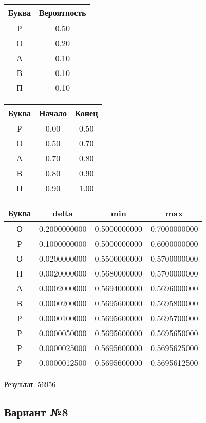 \documentclass[a4paper, 12pt]{article}
\begin{document}
\begin{center}
 \begin{tabular}{ |c|c| } 
  \hline
     Буква & Вероятность \\ \hline
Р & 0.50\\\hline
О & 0.20\\\hline
А & 0.10\\\hline
В & 0.10\\\hline
П & 0.10
\\ \hline \end{tabular}
\end{center}
\begin{center}
 \begin{tabular}{ |c|c|c| } 
  \hline
     Буква & Начало & Конец \\ \hline
Р & 0.00 & 0.50\\\hline
О & 0.50 & 0.70\\\hline
А & 0.70 & 0.80\\\hline
В & 0.80 & 0.90\\\hline
П & 0.90 & 1.00
\\ \hline \end{tabular}
\end{center}
\begin{center}
 \begin{tabular}{ |c|c|c|c| } 
  \hline
     Буква & delta & min & max \\ \hline
О & 0.2000000000 & 0.5000000000 & 0.7000000000\\\hline
Р & 0.1000000000 & 0.5000000000 & 0.6000000000\\\hline
О & 0.0200000000 & 0.5500000000 & 0.5700000000\\\hline
П & 0.0020000000 & 0.5680000000 & 0.5700000000\\\hline
А & 0.0002000000 & 0.5694000000 & 0.5696000000\\\hline
В & 0.0000200000 & 0.5695600000 & 0.5695800000\\\hline
Р & 0.0000100000 & 0.5695600000 & 0.5695700000\\\hline
Р & 0.0000050000 & 0.5695600000 & 0.5695650000\\\hline
Р & 0.0000025000 & 0.5695600000 & 0.5695625000\\\hline
Р & 0.0000012500 & 0.5695600000 & 0.5695612500
\\ \hline \end{tabular}
\end{center}
Результат: 56956
\pagebreak
\subsection{Вариант №8}
\end{document}
